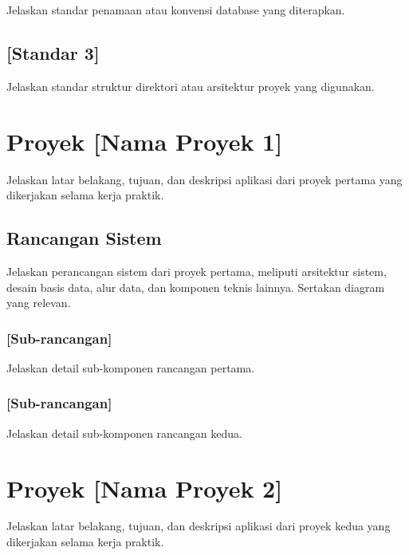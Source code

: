 Jelaskan standar penamaan atau konvensi database yang diterapkan.

\subsection{[Standar 3]}

Jelaskan standar struktur direktori atau arsitektur proyek yang digunakan.

\section{Proyek [Nama Proyek 1]}

Jelaskan latar belakang, tujuan, dan deskripsi aplikasi dari proyek pertama
yang dikerjakan selama kerja praktik.

\subsection{Rancangan Sistem}

Jelaskan perancangan sistem dari proyek pertama, meliputi arsitektur sistem,
desain basis data, alur data, dan komponen teknis lainnya. Sertakan diagram
yang relevan.


\subsubsection{[Sub-rancangan]}

Jelaskan detail sub-komponen rancangan pertama.

\subsubsection{[Sub-rancangan]}

Jelaskan detail sub-komponen rancangan kedua.

\section{Proyek [Nama Proyek 2]}

Jelaskan latar belakang, tujuan, dan deskripsi aplikasi dari proyek kedua
yang dikerjakan selama kerja praktik.

